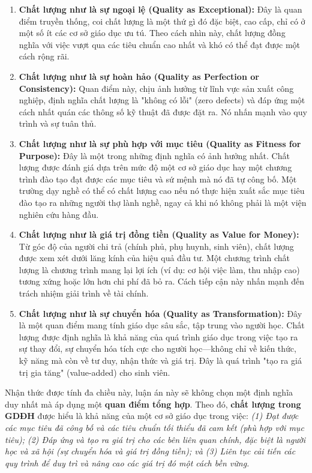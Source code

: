 \documentclass[12pt, a4paper, openany]{report}
\begin{document}
\begin{enumerate}
    \item \textbf{Chất lượng như là sự ngoại lệ (Quality as Exceptional):} Đây là quan điểm truyền thống, coi chất lượng là một thứ gì đó đặc biệt, cao cấp, chỉ có ở một số ít các cơ sở giáo dục ưu tú. Theo cách nhìn này, chất lượng đồng nghĩa với việc vượt qua các tiêu chuẩn cao nhất và khó có thể đạt được một cách rộng rãi.
    
    \item \textbf{Chất lượng như là sự hoàn hảo (Quality as Perfection or Consistency):} Quan điểm này, chịu ảnh hưởng từ lĩnh vực sản xuất công nghiệp, định nghĩa chất lượng là "không có lỗi" (zero defects) và đáp ứng một cách nhất quán các thông số kỹ thuật đã được đặt ra. Nó nhấn mạnh vào quy trình và sự tuân thủ.
    
    \item \textbf{Chất lượng như là sự phù hợp với mục tiêu (Quality as Fitness for Purpose):} Đây là một trong những định nghĩa có ảnh hưởng nhất. Chất lượng được đánh giá dựa trên mức độ một cơ sở giáo dục hay một chương trình đào tạo đạt được các mục tiêu và sứ mệnh mà nó đã tự công bố. Một trường dạy nghề có thể có chất lượng cao nếu nó thực hiện xuất sắc mục tiêu đào tạo ra những người thợ lành nghề, ngay cả khi nó không phải là một viện nghiên cứu hàng đầu.
    
    \item \textbf{Chất lượng như là giá trị đồng tiền (Quality as Value for Money):} Từ góc độ của người chi trả (chính phủ, phụ huynh, sinh viên), chất lượng được xem xét dưới lăng kính của hiệu quả đầu tư. Một chương trình chất lượng là chương trình mang lại lợi ích (ví dụ: cơ hội việc làm, thu nhập cao) tương xứng hoặc lớn hơn chi phí đã bỏ ra. Cách tiếp cận này nhấn mạnh đến trách nhiệm giải trình về tài chính.
    
    \item \textbf{Chất lượng như là sự chuyển hóa (Quality as Transformation):} Đây là một quan điểm mang tính giáo dục sâu sắc, tập trung vào người học. Chất lượng được định nghĩa là khả năng của quá trình giáo dục trong việc tạo ra sự thay đổi, sự chuyển hóa tích cực cho người học—không chỉ về kiến thức, kỹ năng mà còn về tư duy, nhận thức và giá trị. Đây là quá trình "tạo ra giá trị gia tăng" (value-added) cho sinh viên.
\end{enumerate}

Nhận thức được tính đa chiều này, luận án này sẽ không chọn một định nghĩa duy nhất mà áp dụng một \textbf{quan điểm tổng hợp}. Theo đó, \textbf{chất lượng trong GDĐH} được hiểu là khả năng của một cơ sở giáo dục trong việc: \textit{(1) Đạt được các mục tiêu đã công bố và các tiêu chuẩn tối thiểu đã cam kết (phù hợp với mục tiêu); (2) Đáp ứng và tạo ra giá trị cho các bên liên quan chính, đặc biệt là người học và xã hội (sự chuyển hóa và giá trị đồng tiền); và (3) Liên tục cải tiến các quy trình để duy trì và nâng cao các giá trị đó một cách bền vững.}
\end{document}
